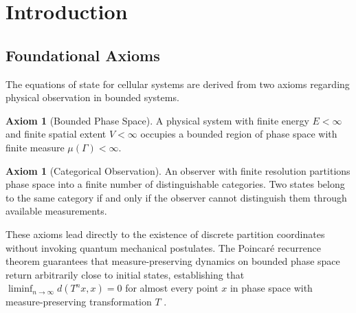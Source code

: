 \documentclass[12pt,a4paper]{article}
\theoremstyle{plain}
\theoremstyle{definition}
\newtheorem{axiom}[theorem]{Axiom}
\theoremstyle{remark}
\begin{document}
\begin{abstract}
($\pm 3$ ppm), ion trap plasma measurements ($\pm 5\%$), superconducting transition temperatures ($\pm 2\%$), electron gas transport coefficients (within experimental uncertainty), time-resolved infrared spectroscopy of protein folding, and single-molecule FRET of membrane transport.

\textbf{Keywords:} cellular state equations, partition coordinates, S-entropy space, categorical distance, metabolic positioning, enzymatic apertures, phase-lock networks, Poincaré computing, protein folding, membrane transport, categorical thermometry, virtual measurement
\end{abstract}

\tableofcontents
\newpage

\section{Introduction}
\label{sec:introduction}

\subsection{Foundational Axioms}

The equations of state for cellular systems are derived from two axioms regarding physical observation in bounded systems.

\begin{axiom}[Bounded Phase Space]
\label{ax:bounded}
A physical system with finite energy $E < \infty$ and finite spatial extent $V < \infty$ occupies a bounded region of phase space with finite measure $\mu(\Gamma) < \infty$.
\end{axiom}

\begin{axiom}[Categorical Observation]
\label{ax:categorical}
An observer with finite resolution partitions phase space into a finite number of distinguishable categories. Two states belong to the same category if and only if the observer cannot distinguish them through available measurements.
\end{axiom}

These axioms lead directly to the existence of discrete partition coordinates without invoking quantum mechanical postulates. The Poincaré recurrence theorem \citep{poincare1890probleme} guarantees that measure-preserving dynamics on bounded phase space return arbitrarily close to initial states, establishing that $\liminf_{n \to \infty} d(T^n x, x) = 0$ for almost every point $x$ in phase space with measure-preserving transformation $T$ \citep{katok1995introduction}.
\end{document}
